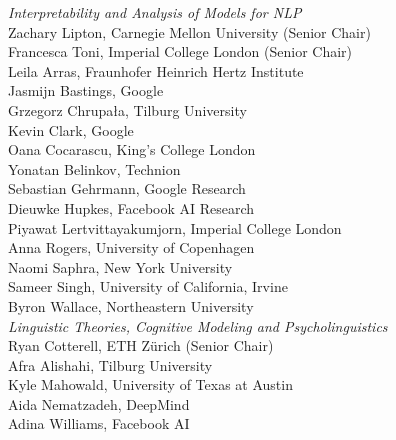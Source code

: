 \emph{Interpretability and Analysis of Models for NLP} \\
\hspace*{0.2in} Zachary Lipton, Carnegie Mellon University (Senior Chair)\\
\hspace*{0.2in} Francesca Toni, Imperial College London (Senior Chair)\\
\hspace*{0.2in} Leila Arras, Fraunhofer Heinrich Hertz Institute\\
\hspace*{0.2in} Jasmijn Bastings, Google\\
\hspace*{0.2in} Grzegorz Chrupała, Tilburg University\\
\hspace*{0.2in} Kevin Clark, Google\\
\hspace*{0.2in} Oana Cocarascu, King's College London\\
\hspace*{0.2in} Yonatan Belinkov, Technion\\
\hspace*{0.2in} Sebastian Gehrmann, Google Research\\
\hspace*{0.2in} Dieuwke Hupkes, Facebook AI Research\\
\hspace*{0.2in} Piyawat Lertvittayakumjorn, Imperial College London\\
\hspace*{0.2in} Anna Rogers, University of Copenhagen\\
\hspace*{0.2in} Naomi Saphra, New York University\\
\hspace*{0.2in} Sameer Singh, University of California, Irvine\\
\hspace*{0.2in} Byron Wallace, Northeastern University\\

\emph{Linguistic Theories, Cognitive Modeling and Psycholinguistics} \\
\hspace*{0.2in} Ryan Cotterell, ETH Zürich (Senior Chair)\\
\hspace*{0.2in} Afra Alishahi, Tilburg University\\
\hspace*{0.2in} Kyle Mahowald, University of Texas at Austin\\
\hspace*{0.2in} Aida Nematzadeh, DeepMind\\
\hspace*{0.2in} Adina Williams, Facebook AI\\

